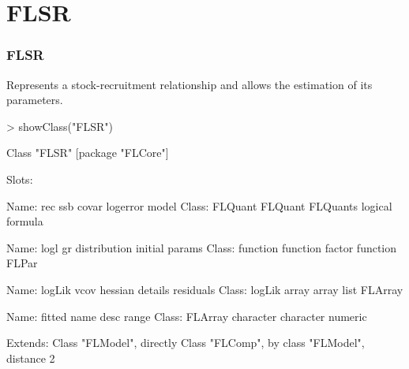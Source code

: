 \documentclass{beamer}%
\begin{document}
\section{FLSR}
\begin{frame}[containsverbatim]
  \frametitle{FLSR}
Represents a stock-recruitment relationship and allows the estimation of its parameters.
{\scriptsize{
\begin{Schunk}
\begin{Sinput}
> showClass("FLSR")
\end{Sinput}
\begin{Soutput}
Class "FLSR" [package "FLCore"]

Slots:
                                                                       
Name:           rec          ssb        covar     logerror        model
Class:      FLQuant      FLQuant     FLQuants      logical      formula
                                                                       
Name:          logl           gr distribution      initial       params
Class:     function     function       factor     function        FLPar
                                                                       
Name:        logLik         vcov      hessian      details    residuals
Class:       logLik        array        array         list      FLArray
                                                          
Name:        fitted         name         desc        range
Class:      FLArray    character    character      numeric

Extends: 
Class "FLModel", directly
Class "FLComp", by class "FLModel", distance 2
\end{Soutput}
\end{Schunk}
}}
\end{frame}

\end{document}
